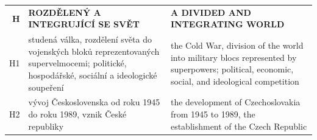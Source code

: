 \documentclass[]{interact}
\theoremstyle{plain}%
\theoremstyle{definition}
\theoremstyle{remark}
\begin{document}
\begin{table}
{\begin{tabular}{r|p{10cm}|p{10cm}}
\textbf{H} & \textbf{ROZDĚLENÝ A INTEGRUJÍCÍ SE SVĚT} & \textbf{A DIVIDED AND INTEGRATING WORLD} \\ 
H1 & studená válka, rozdělení světa do vojenských bloků reprezentovaných supervelmocemi; politické, hospodářské, sociální a ideologické soupeření & the Cold War, division of the world into military blocs represented by superpowers; political, economic, social, and ideological competition \\ 
H2 & vývoj Československa od roku 1945 do roku 1989, vznik České republiky & the development of Czechoslovakia from 1945 to 1989, the establishment of the Czech Republic \\
\end{tabular}}\label{table:national-curriculum-topics}

\end{table}
\end{document}
